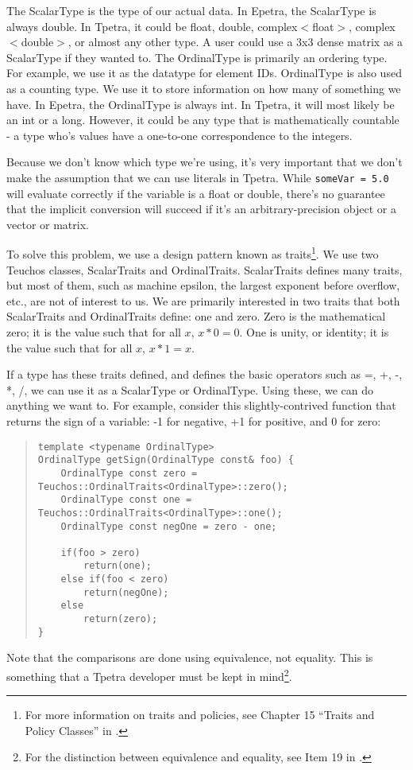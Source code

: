 \documentclass[10pt,relax]{TpetraDesign}
\begin{document}
The ScalarType is the type of our actual data. In Epetra, the ScalarType is always double. In Tpetra, it could be float, double, complex$<$float$>$, complex$<$double$>$, or almost any other type. A user could use a 3x3 dense matrix as a ScalarType if they wanted to. The OrdinalType is primarily an ordering type. For example, we use it as the datatype for element IDs. OrdinalType is also used as a counting type. We use it to store information on how many of something we have. In Epetra, the OrdinalType is always int. In Tpetra, it will most likely be an int or a long. However, it could be any type that is mathematically countable - a type who's values have a one-to-one correspondence to the integers.

Because we don't know which type we're using, it's very important that we don't make the assumption that we can use literals in Tpetra. While \texttt{someVar = 5.0} will evaluate correctly if the variable is a float or double, there's no guarantee that the implicit conversion will succeed if it's an arbitrary-precision object or a vector or matrix.

To solve this problem, we use a design pattern known as traits\footnote{For more information on traits and policies, see Chapter 15 ``Traits and Policy Classes'' in \cite{Templates-Complete-Guide}.}. We use two Teuchos\cite{Teuchos} classes, ScalarTraits and OrdinalTraits. ScalarTraits defines many traits, but most of them, such as machine epsilon, the largest exponent before overflow, etc., are not of interest to us. We are primarily interested in two traits that both ScalarTraits and OrdinalTraits define: one and zero. Zero is the mathematical zero; it is the value such that for all $x$, $x * 0 = 0$. One is unity, or identity; it is the value such that for all $x$, $x * 1 = x$.


If a type has these traits defined, and defines the basic operators such as =, +, -, *, /, we can use it as a ScalarType or OrdinalType. Using these, we can do anything we want to. For example, consider this slightly-contrived function that returns the sign of a variable: -1 for negative, +1 for positive, and 0 for zero:
\begin{quote}
\begin{verbatim}
template <typename OrdinalType>
OrdinalType getSign(OrdinalType const& foo) {
    OrdinalType const zero = Teuchos::OrdinalTraits<OrdinalType>::zero();
    OrdinalType const one = Teuchos::OrdinalTraits<OrdinalType>::one();
    OrdinalType const negOne = zero - one;
    
    if(foo > zero)
        return(one);
    else if(foo < zero)
        return(negOne);
    else
        return(zero);
}
\end{verbatim}
\end{quote}
Note that the comparisons are done using equivalence, not equality. This is something that a Tpetra developer must be kept in mind\footnote{For the distinction between equivalence and equality, see Item 19 in \cite{Effective-STL}.}. 
\end{document}
